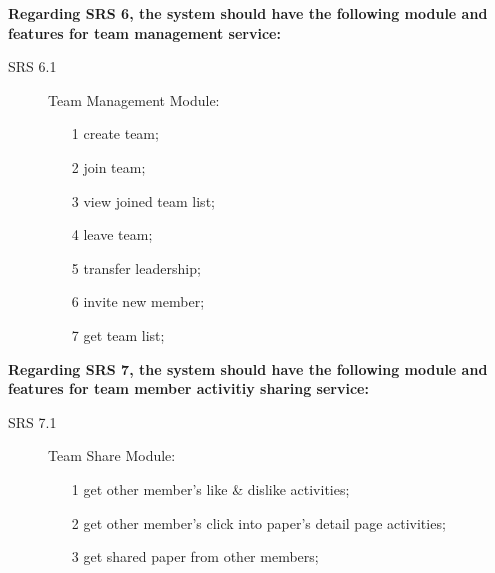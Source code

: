 \noindent
\textbf{Regarding SRS 6, the system should have the following module and features for team management service:}

\begin{description}
	\item[SRS 6.1] Team Management Module:
		\begin{itemize}
			\item [1]
			      create team;
			\item [2]
			      join team;
			\item [3]
			      view joined team list;
			\item [4]
			      leave team;
			\item [5]
			      transfer leadership;
			\item [6]
			      invite new member;
			\item [7]
			      get team list;
		\end{itemize}
\end{description}

\noindent
\textbf{Regarding SRS 7, the system should have the following module and features for team member activitiy sharing service:}

\begin{description}
	\item[SRS 7.1] Team Share Module:
		\begin{itemize}
			\item [1]
			      get other member's like \& dislike activities;
			\item [2]
			      get other member's click into paper's detail page activities;
			\item [3]
			      get shared paper from other members;
		\end{itemize}
\end{description}
